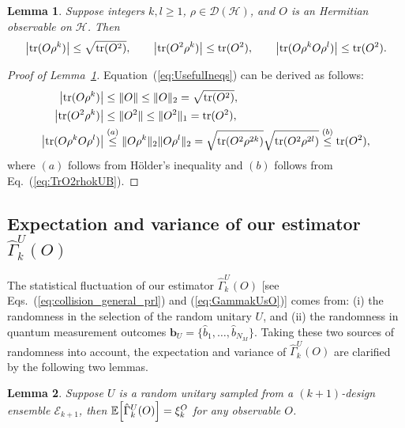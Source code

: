 \documentclass[aps,prl,twocolumn,nofootinbib,superscriptaddress,10pt]{revtex4-2}
\let\originalleft\left
\let\originalright\right
\renewcommand{\left}{\mathopen{}\mathclose\bgroup\originalleft}
\renewcommand{\right}{\aftergroup\egroup\originalright}
\def\E{ {\mathbb E} } %
\DeclareMathOperator{\Tr}{tr}
\theoremstyle{plain}
\newtheorem{lemma}{Lemma}
\theoremstyle{definition}
\newcommand{\caH}{\mathcal{H}}
\newcommand{\caD}{\mathcal{D}}
\def\eqref#1{\textup{(\ref{#1})}}
\newcommand{\eref}[1]{Eq.~\textup{(\ref{#1})}}
\newcommand{\lref}[1]{Lemma~\ref{#1}}
\begin{document}
\begin{lemma}\label{lem:UsefulIneqs}
Suppose integers $k,l\geq 1$, $\rho\in\caD(\caH)$, 
and $O$ is an Hermitian observable on $\caH$. 
Then 
\begin{align}\label{eq:UsefulIneqs}
\left| \Tr(O\rho^k) \right| \leq \sqrt{\Tr(O^2)},
\qquad 
\left| \Tr(O^2\rho^k) \right| \leq \Tr(O^2),
\qquad 
\left| \Tr(O\rho^{k}O\rho^l) \right| \leq \Tr(O^2). 
\end{align}
\end{lemma}

\begin{proof}[Proof of \lref{lem:UsefulIneqs}]
Equation~\eqref{eq:UsefulIneqs} can be derived as follows: 
\begin{align}
\left| \Tr(O\rho^k) \right| 
&\leq \|O\| \leq \|O\|_2 =\sqrt{\Tr(O^2)},
\\
\left| \Tr(O^2\rho^k) \right| 
&\leq \|O^2\| \leq \|O^2\|_1 =\Tr(O^2), 
\label{eq:TrO2rhokUB}
\\
\left| \Tr(O\rho^{k}O\rho^l) \right| 
&\stackrel{(a)}{\leq} \|O\rho^{k}\|_2 \|O\rho^l\|_2 
= \sqrt{\Tr(O^2\rho^{2k})} \sqrt{\Tr(O^2\rho^{2l})} \stackrel{(b)}{\leq} \Tr(O^2),
\end{align}
where $(a)$ follows from H\"{o}lder's inequality and $(b)$ follows from \eref{eq:TrO2rhokUB}. 
\end{proof}


\subsection{Expectation and variance of our estimator \texorpdfstring{$\hat{\Gamma}_k^{U}(O)$}{}}\label{sec:ExpVarCBNE}
The statistical fluctuation of our estimator $\hat{\Gamma}_k^{U}(O)$ [see Eqs.~\eqref{eq:collision_general_prl} and \eqref{eq:GammakUsO}] comes from: 
(i) the randomness in the selection of the random unitary $U$, and 
(ii) the randomness in quantum measurement outcomes $\mathbf{b}_{U} = \{\hat{b}_1, \dots, \hat{b}_{N_M}\}$. 
Taking these two sources of randomness into account, the expectation and variance of $\hat{\Gamma}_k^{U}(O)$ are 
clarified by the following two lemmas.  


\begin{lemma}\label{lam:UnbiasGammakU}
Suppose $U$ is a random unitary  sampled from a $(k+1)$-design ensemble $\mathcal E_{k+1}$, then 
$\E \left[ \hat{\Gamma}_k^U (O)\right] =\xi_k^{O}$ for any observable $O$. 
\end{lemma}
\end{document}
